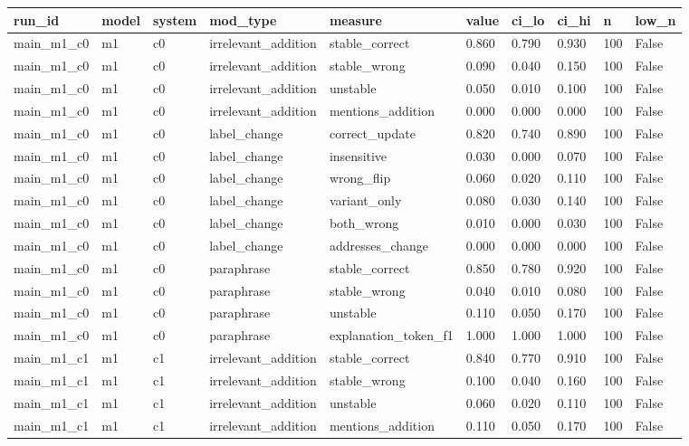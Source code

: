 \begin{tabular}{llllllllll}
\toprule
run\_id & model & system & mod\_type & measure & value & ci\_lo & ci\_hi & n & low\_n \\
\midrule
main\_m1\_c0 & m1 & c0 & irrelevant\_addition & stable\_correct & 0.860 & 0.790 & 0.930 & 100 & False \\
main\_m1\_c0 & m1 & c0 & irrelevant\_addition & stable\_wrong & 0.090 & 0.040 & 0.150 & 100 & False \\
main\_m1\_c0 & m1 & c0 & irrelevant\_addition & unstable & 0.050 & 0.010 & 0.100 & 100 & False \\
main\_m1\_c0 & m1 & c0 & irrelevant\_addition & mentions\_addition & 0.000 & 0.000 & 0.000 & 100 & False \\
main\_m1\_c0 & m1 & c0 & label\_change & correct\_update & 0.820 & 0.740 & 0.890 & 100 & False \\
main\_m1\_c0 & m1 & c0 & label\_change & insensitive & 0.030 & 0.000 & 0.070 & 100 & False \\
main\_m1\_c0 & m1 & c0 & label\_change & wrong\_flip & 0.060 & 0.020 & 0.110 & 100 & False \\
main\_m1\_c0 & m1 & c0 & label\_change & variant\_only & 0.080 & 0.030 & 0.140 & 100 & False \\
main\_m1\_c0 & m1 & c0 & label\_change & both\_wrong & 0.010 & 0.000 & 0.030 & 100 & False \\
main\_m1\_c0 & m1 & c0 & label\_change & addresses\_change & 0.000 & 0.000 & 0.000 & 100 & False \\
main\_m1\_c0 & m1 & c0 & paraphrase & stable\_correct & 0.850 & 0.780 & 0.920 & 100 & False \\
main\_m1\_c0 & m1 & c0 & paraphrase & stable\_wrong & 0.040 & 0.010 & 0.080 & 100 & False \\
main\_m1\_c0 & m1 & c0 & paraphrase & unstable & 0.110 & 0.050 & 0.170 & 100 & False \\
main\_m1\_c0 & m1 & c0 & paraphrase & explanation\_token\_f1 & 1.000 & 1.000 & 1.000 & 100 & False \\
main\_m1\_c1 & m1 & c1 & irrelevant\_addition & stable\_correct & 0.840 & 0.770 & 0.910 & 100 & False \\
main\_m1\_c1 & m1 & c1 & irrelevant\_addition & stable\_wrong & 0.100 & 0.040 & 0.160 & 100 & False \\
main\_m1\_c1 & m1 & c1 & irrelevant\_addition & unstable & 0.060 & 0.020 & 0.110 & 100 & False \\
main\_m1\_c1 & m1 & c1 & irrelevant\_addition & mentions\_addition & 0.110 & 0.050 & 0.170 & 100 & False \\

\end{tabular}

